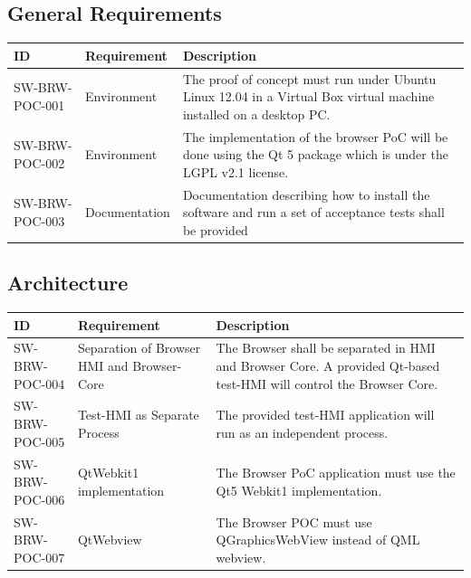 \documentclass{pelagicore}
\begin{document}
\subsection{General Requirements}
\begin{tabularx}{\textwidth}{| p{4em} | p{6.5em} | X |}
    \hline
    \rowcolor{blue}
    \bf ID & \bf Requirement & \bf Description \\
    \hline
    SW-BRW-POC-001 & Environment   & The proof of concept must run under Ubuntu
                                     Linux 12.04 in a Virtual Box virtual
                                     machine installed on a desktop PC. \\
    \hline
    SW-BRW-POC-002 & Environment   & The implementation of the browser PoC will
                                     be done using the Qt 5 package which is
                                     under the LGPL v2.1 license. \\
    \hline
    SW-BRW-POC-003 & Documentation & Documentation describing how to install
                                     the software and run a set of acceptance
                                     tests shall be provided \\
    \hline
\end{tabularx}


\subsection{Architecture}
\begin{tabularx}{\textwidth}{|p{4em} | p{6.5em} | X |}
    \hline
    \rowcolor{blue}
    \bf ID & \bf Requirement & \bf Description \\
    \hline
    SW-BRW-POC-004 & Separation of Browser HMI and Browser-Core &
        The Browser shall be separated in HMI and Browser Core.
        A provided Qt-based test-HMI will control the Browser Core. \\
    \hline
    SW-BRW-POC-005 & Test-HMI as Separate Process &
        The provided test-HMI application will run as an independent process.\\
    \hline
    SW-BRW-POC-006 & QtWebkit1 implementation &
        The Browser PoC application must use the Qt5 Webkit1 implementation.\\
    \hline
    SW-BRW-POC-007 & QtWebview &
        The Browser POC must use QGraphicsWebView instead of QML webview.\\
    \hline
\end{tabularx}
\end{document}

